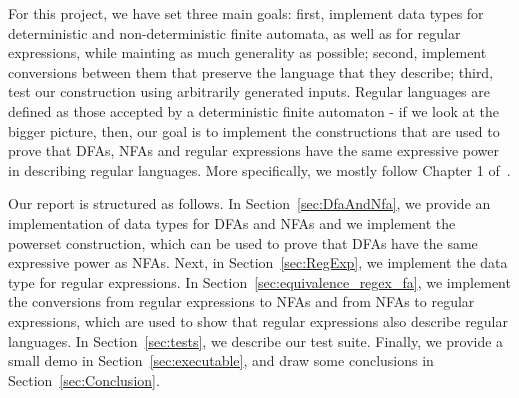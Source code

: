 For this project, we have set three main goals: 
first, implement data types for deterministic and non-deterministic finite automata, as well as for regular expressions,
while mainting as much generality as possible;
second, implement conversions between them that preserve the language that they describe;
third, test our construction using arbitrarily generated inputs.
Regular languages are defined as those accepted by a deterministic finite automaton
- if we look at the bigger picture, then, our goal is to implement the constructions
that are used to prove that DFAs, NFAs and regular expressions have the same expressive power
in describing regular languages. 
More specifically, we mostly follow Chapter 1 of~\cite{sipser2012}.

Our report is structured as follows.
In Section~\ref{sec:DfaAndNfa}, we provide an implementation of data types for DFAs and NFAs
and we implement the powerset construction, 
which can be used to prove that DFAs have the same expressive power as NFAs.
Next, in Section~\ref{sec:RegExp}, we implement the data type for regular expressions.
In Section~\ref{sec:equivalence_regex_fa}, we implement the conversions from regular expressions to NFAs
and from NFAs to regular expressions,
which are used to show that regular expressions also describe regular languages.
In Section~\ref{sec:tests}, we describe our test suite.
Finally, we provide a small demo in Section~\ref{sec:executable},
and draw some conclusions in Section~\ref{sec:Conclusion}.